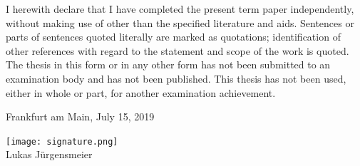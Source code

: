 \documentclass[12pt,a4paper]{article}
\begin{document}
I herewith declare that I have completed the present term paper independently, without making use of
other than the specified literature and aids. Sentences or parts of sentences quoted literally are
marked as quotations; identification of other references with regard to the statement and scope of
the work is quoted. The thesis in this form or in any other form has not been submitted to an examination body and has not been published.
This thesis has not been used, either in whole or part, for another examination achievement.

\vspace{1cm}

Frankfurt am Main, July 15, 2019

\texttt{[image: signature.png]}\\
Lukas J\"urgensmeier
\end{document}
